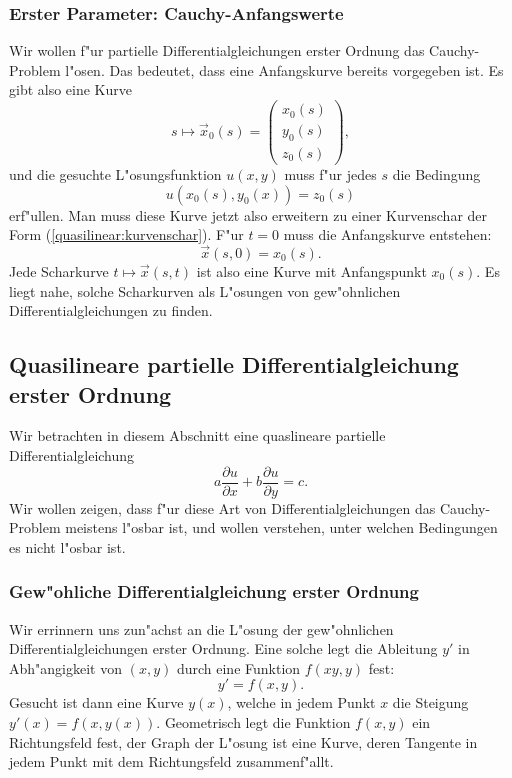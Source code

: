 \subsubsection{Erster Parameter: Cauchy-Anfangswerte}
Wir wollen f"ur partielle Differentialgleichungen erster Ordnung
das Cauchy-Problem l"osen.
Das bedeutet, dass eine Anfangskurve bereits vorgegeben ist.
Es gibt also eine Kurve
\begin{equation}
s\mapsto\vec x_0(s)=\begin{pmatrix}
x_0(s)\\
y_0(s)\\
z_0(s)
\end{pmatrix},
\label{quasilinear:anfangskurve}
\end{equation}
und die gesuchte L"osungsfunktion $u(x,y)$ muss f"ur jedes $s$ die
Bedingung
\[
u(x_0(s), y_0(x))=z_0(s)
\]
erf"ullen.
Man muss diese Kurve jetzt also erweitern zu einer Kurvenschar
der Form (\ref{quasilinear:kurvenschar}).
F"ur $t=0$ muss die Anfangskurve entstehen:
\[
\vec x(s,0)=x_0(s).
\]
Jede Scharkurve $t\mapsto \vec x(s,t)$ ist also eine Kurve
mit Anfangspunkt $x_0(s)$.
Es liegt nahe, solche Scharkurven als L"osungen von gew"ohnlichen
Differentialgleichungen zu finden.

\subsection{Quasilineare partielle Differentialgleichung erster Ordnung}
Wir betrachten in diesem Abschnitt eine quaslineare partielle 
Differentialgleichung
\begin{equation}
a\frac{\partial u}{\partial x}
+
b\frac{\partial u}{\partial y}
=
c.
\label{quasilinear:equation}
\end{equation}
Wir wollen zeigen, dass f"ur diese Art von Differentialgleichungen
das Cauchy-Problem meistens l"osbar ist, und wollen verstehen,
unter welchen Bedingungen es nicht l"osbar ist.

\subsubsection{Gew"ohliche Differentialgleichung erster Ordnung}
Wir errinnern uns zun"achst an die L"osung der gew"ohnlichen
Differentialgleichungen erster Ordnung.
Eine solche legt die Ableitung $y'$ in Abh"angigkeit von 
$(x,y)$ durch eine Funktion $f(xy,y)$ fest: 
\[
y'=f(x,y).
\]
Gesucht ist dann eine Kurve $y(x)$, welche
in jedem Punkt $x$ die Steigung $y'(x)=f(x,y(x))$.
Geometrisch legt die Funktion $f(x,y)$ ein Richtungsfeld fest,
der Graph der L"osung ist eine Kurve, deren Tangente in jedem
Punkt mit dem Richtungsfeld zusammenf"allt.

